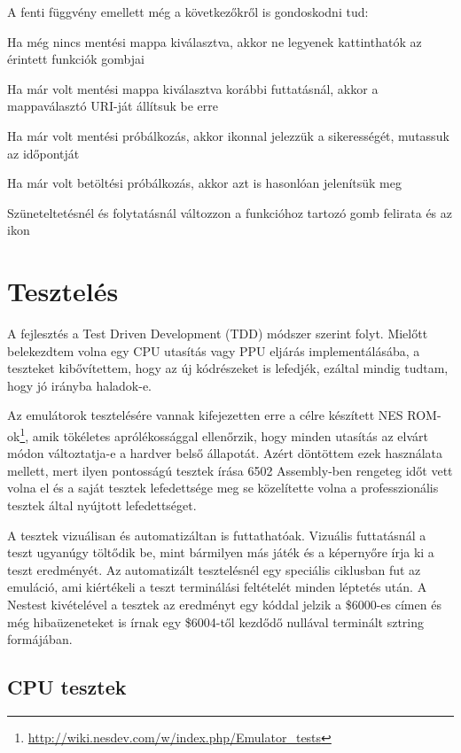 A fenti függvény emellett még a következőkről is gondoskodni tud:
\begin{compactitem}
	\item Ha még nincs mentési mappa kiválasztva, akkor ne legyenek kattinthatók az érintett funkciók gombjai
	\item Ha már volt mentési mappa kiválasztva korábbi futtatásnál, akkor a mappaválasztó URI-ját állítsuk be erre
	\item Ha már volt mentési próbálkozás, akkor ikonnal jelezzük a sikerességét, mutassuk az időpontját
	\item Ha már volt betöltési próbálkozás, akkor azt is hasonlóan jelenítsük meg
	\item Szüneteltetésnél és folytatásnál változzon a funkcióhoz tartozó gomb felirata és az ikon
\end{compactitem}

\section{Tesztelés}

A fejlesztés a Test Driven Development (TDD) módszer szerint folyt. Mielőtt belekezdtem volna egy CPU utasítás vagy PPU eljárás implementálásába, a teszteket kibővítettem, hogy az új kódrészeket is lefedjék, ezáltal mindig tudtam, hogy jó irányba haladok-e.

Az emulátorok tesztelésére vannak kifejezetten erre a célre készített NES ROM-ok\footnote{\url{http://wiki.nesdev.com/w/index.php/Emulator_tests}}, amik tökéletes aprólékossággal ellenőrzik, hogy minden utasítás az elvárt módon változtatja-e a hardver belső állapotát. Azért döntöttem ezek használata mellett, mert ilyen pontosságú tesztek írása 6502 Assembly-ben rengeteg időt vett volna el és a saját tesztek lefedettsége meg se közelítette volna a professzionális tesztek által nyújtott lefedettséget.

A tesztek vizuálisan és automatizáltan is futtathatóak. Vizuális futtatásnál a teszt ugyanúgy töltődik be, mint bármilyen más játék és a képernyőre írja ki a teszt eredményét. Az automatizált tesztelésnél egy speciális ciklusban fut az emuláció, ami kiértékeli a teszt terminálási feltételét minden léptetés után. A Nestest kivételével a tesztek az eredményt egy kóddal jelzik a \$6000-es címen és még hibaüzeneteket is írnak egy \$6004-től kezdődő nullával terminált sztring formájában.

\subsection{CPU tesztek}

